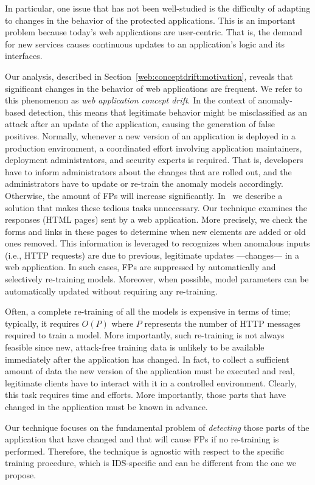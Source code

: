 In particular, one issue that has not been well-studied is the
difficulty of adapting to changes in the behavior of the protected
applications. This is an important problem because today's web
applications are user-centric. That is, the demand for new services
causes continuous updates to an application's logic and its
interfaces.

Our analysis, described in Section~\ref{web:conceptdrift:motivation},
reveals that significant changes in the behavior of web applications
are frequent. We refer to this phenomenon as \emph{web application
  concept drift}. In the context of anomaly-based detection, this
means that legitimate behavior might be misclassified as an attack
after an update of the application, causing the generation of false
positives. Normally, whenever a new version of an application is
deployed in a production environment, a coordinated effort involving
application maintainers, deployment administrators, and security
experts is required. That is, developers have to inform administrators
about the changes that are rolled out, and the administrators have to
update or re-train the anomaly models accordingly. Otherwise, the
amount of \acp{FP} will increase
significantly. In~\citep{2009_maggi_robertson_kruegel_vigna} we
describe a solution that makes these tedious tasks unnecessary. Our
technique examines the responses (\ac{HTML} pages) sent by
a web application. More precisely, we check the forms and links in
these pages to determine when new elements are added or old ones
removed. This information is leveraged to recognizes when anomalous
inputs (i.e., \ac{HTTP} requests) are due to previous,
legitimate updates ---changes--- in a web application. In such cases,
\acp{FP} are suppressed by automatically and selectively
re-training models. Moreover, when possible, model parameters can be
automatically updated without requiring any re-training.

\begin{note}[Re-training]
  Often, a complete re-training of all the models is expensive in
  terms of time; typically, it requires $O(P)$ where $P$ represents
  the number of \ac{HTTP} messages required to train a
  model. More importantly, such re-training is not always feasible
  since new, attack-free training data is unlikely to be available
  immediately after the application has changed. In fact, to collect a
  sufficient amount of data the new version of the application must be
  executed and real, legitimate clients have to interact with it in a
  controlled environment. Clearly, this task requires time and
  efforts. More importantly, those parts that have changed in the
  application must be known in advance.

  Our technique focuses on the fundamental problem of \emph{detecting}
  those parts of the application that have changed and that will cause
  \acp{FP} if no re-training is performed. Therefore, the
  technique is agnostic with respect to the specific training
  procedure, which is \ac{IDS}-specific and can be different from the
  one we propose.
\end{note}

